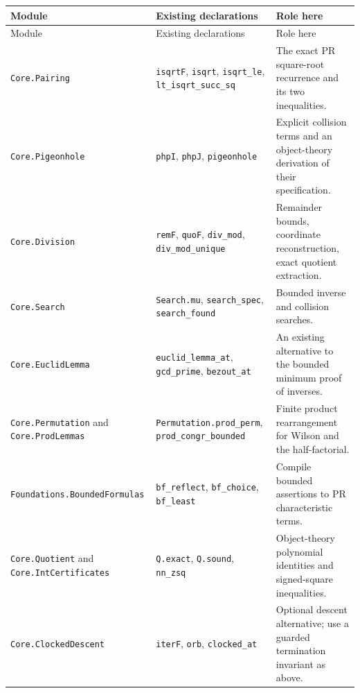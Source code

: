 \documentclass[11pt,letterpaper]{article}
\theoremstyle{definition}
\theoremstyle{remark}
\begin{document}
\begin{longtable}{@{}>{\raggedright\arraybackslash}p{}>{\raggedright\arraybackslash}p{}>{\raggedright\arraybackslash}p{}@{}}
\toprule
Module & Existing declarations & Role here\\
\midrule
\endfirsthead
\toprule Module & Existing declarations & Role here\\
\midrule
\endhead
\texttt{Core.Pairing} &
\texttt{isqrtF}, \texttt{isqrt}, \texttt{isqrt\_le},
\texttt{lt\_isqrt\_succ\_sq} &
The exact PR square-root recurrence and its two inequalities.\\
\addlinespace
\texttt{Core.Pigeonhole} &
\texttt{phpI}, \texttt{phpJ}, \texttt{pigeonhole} &
Explicit collision terms and an object-theory derivation of their specification.\\
\addlinespace
\texttt{Core.Division} &
\texttt{remF}, \texttt{quoF}, \texttt{div\_mod},
\texttt{div\_mod\_unique} &
Remainder bounds, coordinate reconstruction, exact quotient extraction.\\
\addlinespace
\texttt{Core.Search} &
\texttt{Search.mu}, \texttt{search\_spec},
\texttt{search\_found} &
Bounded inverse and collision searches.\\
\addlinespace
\texttt{Core.EuclidLemma} &
\texttt{euclid\_lemma\_at}, \texttt{gcd\_prime},
\texttt{bezout\_at} &
An existing alternative to the bounded minimum proof of inverses.\\
\addlinespace
\texttt{Core.Permutation} and \texttt{Core.ProdLemmas} &
\texttt{Permutation.prod\_perm},
\texttt{prod\_congr\_bounded} &
Finite product rearrangement for Wilson and the half-factorial.\\
\addlinespace
\texttt{Foundations.}\newline\texttt{BoundedFormulas} &
\texttt{bf\_reflect}, \texttt{bf\_choice}, \texttt{bf\_least} &
Compile bounded assertions to PR characteristic terms.\\
\addlinespace
\texttt{Core.Quotient} and \texttt{Core.IntCertificates} &
\texttt{Q.exact}, \texttt{Q.sound}, \texttt{nn\_zsq} &
Object-theory polynomial identities and signed-square inequalities.\\
\addlinespace
\texttt{Core.ClockedDescent} &
\texttt{iterF}, \texttt{orb}, \texttt{clocked\_at} &
Optional descent alternative; use a guarded termination invariant as above.\\
\bottomrule
\end{longtable}
\end{document}
